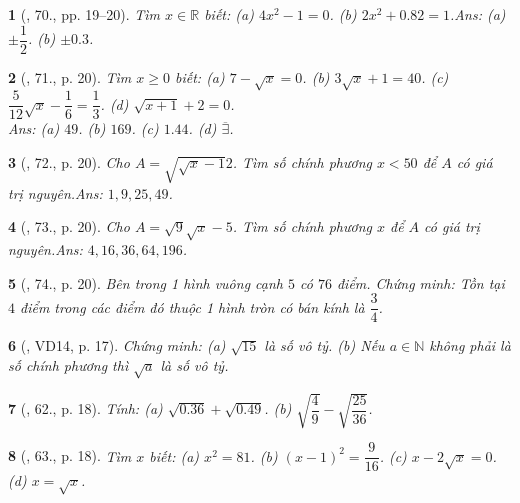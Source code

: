 \documentclass{article}
\newtheorem{baitoan}{}
\begin{document}
\begin{baitoan}[\cite{Tuyen_Toan_7}, 70., pp. 19--20]
	Tìm $x\in\mathbb{R}$ biết: (a) $4x^2 - 1 = 0$. (b) $2x^2 + 0.82 = 1$.\hfill{\sf Ans:} (a) $\pm\dfrac{1}{2}$. (b) $\pm0.3$.
\end{baitoan}

\begin{baitoan}[\cite{Tuyen_Toan_7}, 71., p. 20]
	Tìm $x\ge 0$ biết: (a) $7 - \sqrt{x} = 0$. (b) $3\sqrt{x} + 1 = 40$. (c) $\dfrac{5}{12}\sqrt{x} - \dfrac{1}{6} = \dfrac{1}{3}$. (d) $\sqrt{x + 1} + 2 = 0$.
	\\\mbox{}\hfill{\sf Ans:} (a) $49$. (b) $169$. (c) $1.44$. (d) $\overline{\exists}$.
\end{baitoan}

\begin{baitoan}[\cite{Tuyen_Toan_7}, 72., p. 20]
	Cho $A = \sqrt{\sqrt{x} - 1}{2}$. Tìm số chính phương $x < 50$ để $A$ có giá trị nguyên.\hfill{\sf Ans:} $1,9,25,49$.
\end{baitoan}

\begin{baitoan}[\cite{Tuyen_Toan_7}, 73., p. 20]
	Cho $A = \sqrt{9}{\sqrt{x} - 5}$. Tìm số chính phương $x$ để $A$ có giá trị nguyên.\hfill{\sf Ans:} $4,16,36,64,196$.
\end{baitoan}

\begin{baitoan}[\cite{Tuyen_Toan_7}, 74., p. 20]
	Bên trong 1 hình vuông cạnh $5$ có $76$ điểm. Chứng minh: Tồn tại $4$ điểm trong các điểm đó thuộc 1 hình tròn có bán kính là $\dfrac{3}{4}$.
\end{baitoan}

\begin{baitoan}[\cite{Binh_Toan_7_tap_1}, VD14, p. 17]
	Chứng minh: (a) $\sqrt{15}$ là số vô tỷ. (b) Nếu $a\in\mathbb{N}$ không phải là số chính phương thì $\sqrt{a}$ là số vô tỷ.	
\end{baitoan}

\begin{baitoan}[\cite{Binh_Toan_7_tap_1}, 62., p. 18]
	Tính: (a) $\sqrt{0.36} + \sqrt{0.49}$. (b) $\sqrt{\dfrac{4}{9}} - \sqrt{\dfrac{25}{36}}$.
\end{baitoan}

\begin{baitoan}[\cite{Binh_Toan_7_tap_1}, 63., p. 18]
	Tìm $x$ biết: (a) $x^2 = 81$. (b) $(x - 1)^2 = \dfrac{9}{16}$. (c) $x - 2\sqrt{x} = 0$. (d) $x = \sqrt{x}$.	
\end{baitoan}
\end{document}
